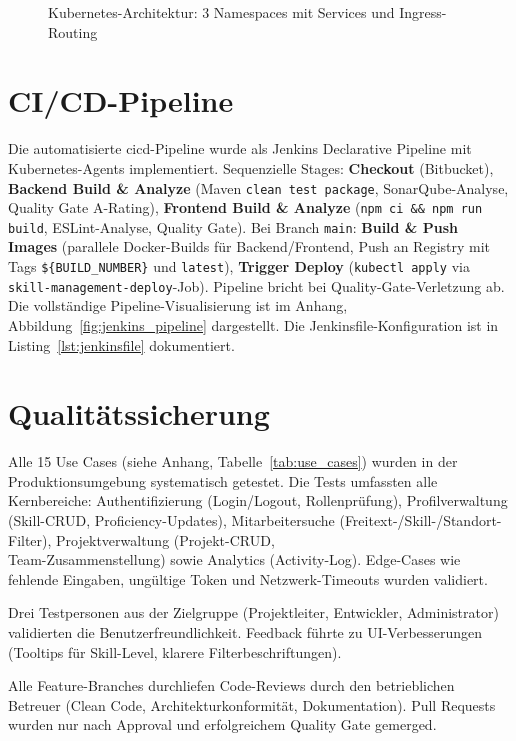 \begin{figure}[H]
\caption{Kubernetes-Architektur: 3 Namespaces mit Services und Ingress-Routing}
\label{fig:kubernetes_architecture}
\end{figure}

\section{CI/CD-Pipeline}
\label{sec:cicd_pipeline}

Die automatisierte \gls{cicd}-Pipeline wurde als Jenkins Declarative Pipeline mit Kubernetes-Agents implementiert\cite{jenkins_docs}. Sequenzielle Stages: \textbf{Checkout} (Bitbucket), \textbf{Backend Build \& Analyze} (Maven \texttt{clean test package}, SonarQube\cite{sonarqube_docs}-Analyse, Quality Gate A-Rating), \textbf{Frontend Build \& Analyze} (\texttt{npm ci \&\& npm run build}, ESLint-Analyse, Quality Gate). Bei Branch \texttt{main}: \textbf{Build \& Push Images} (parallele Docker\cite{docker_docs}-Builds für Backend/Frontend, Push an Registry mit Tags \texttt{\$\{BUILD\_NUMBER\}} und \texttt{latest}), \textbf{Trigger Deploy} (\texttt{kubectl apply} via \texttt{skill-management-deploy}-Job). Pipeline bricht bei Quality-Gate-Verletzung ab. Die vollständige Pipeline-Visualisierung ist im Anhang, Abbildung~\ref{fig:jenkins_pipeline} dargestellt. Die Jenkinsfile-Konfiguration ist in Listing~\ref{lst:jenkinsfile} dokumentiert.

\section{Qualitätssicherung}

Alle 15 Use Cases (siehe Anhang, Tabelle~\ref{tab:use_cases}) wurden in der Produktionsumgebung systematisch getestet. Die Tests umfassten alle Kernbereiche: Authentifizierung (Login/Logout, Rollenprüfung), Profilverwaltung (Skill-CRUD, Proficiency-Updates), Mitarbeitersuche (Freitext-/Skill-/Standort-Filter), Projektverwaltung (Projekt-CRUD, \\ 
Team-Zusammenstellung) sowie Analytics (Activity-Log). Edge-Cases wie fehlende Eingaben, ungültige Token und Netzwerk-Timeouts wurden validiert.

Drei Testpersonen aus der Zielgruppe (Projektleiter, Entwickler, Administrator) validierten die Benutzerfreundlichkeit. Feedback führte zu UI-Verbesserungen (Tooltips für Skill-Level, klarere Filterbeschriftungen).

Alle Feature-Branches durchliefen Code-Reviews durch den betrieblichen Betreuer (Clean Code\cite{clean_code}, Architekturkonformität, Dokumentation). Pull Requests wurden nur nach Approval und erfolgreichem Quality Gate gemerged.